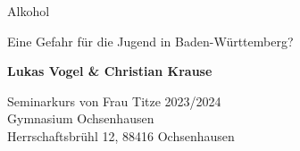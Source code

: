 
\begin{titlepage}
    \begin{center}
        \vspace*{1cm}
 
        {\huge{Alkohol}}
 
        \vspace{0.7cm}
         {\Large Eine Gefahr für die Jugend in Baden-Württemberg?}
             
        \vspace{1cm}
 
        \textbf{Lukas Vogel \& Christian Krause}
              
             
        \vfill
        \large
        Seminarkurs von Frau Titze 2023/2024\\
        Gymnasium Ochsenhausen\\
        Herrschaftsbrühl 12, 88416 Ochsenhausen\\
             
    \end{center}
 \end{titlepage}